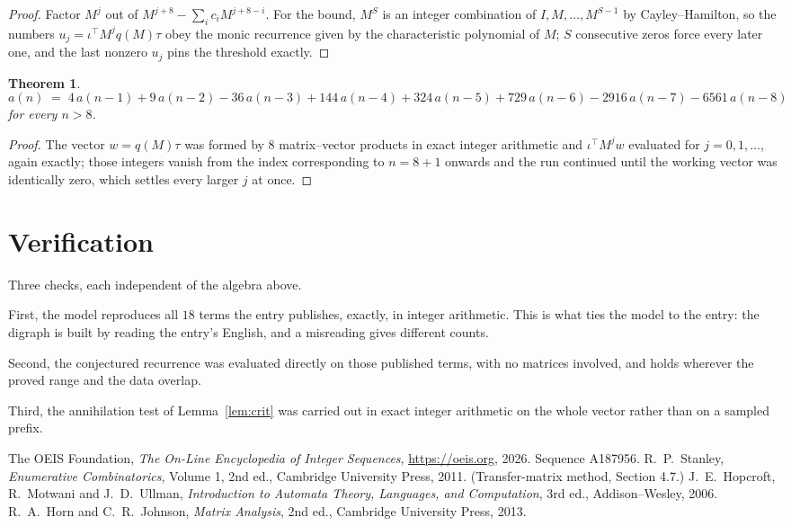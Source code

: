 \documentclass[11pt,a4paper]{article}
\theoremstyle{plain}
\newtheorem{theorem}{Theorem}
\theoremstyle{definition}
\begin{document}
\begin{proof}
Factor $M^{j}$ out of $M^{j+8}-\sum_ic_iM^{j+8-i}$. For the bound, $M^{S}$
is an integer combination of $I,M,\dots,M^{S-1}$ by Cayley--Hamilton, so the numbers
$u_j=\iota^{\!\top}M^{j}q(M)\tau$ obey the monic recurrence given by the characteristic
polynomial of $M$; $S$ consecutive zeros force every later one, and the last nonzero $u_j$
pins the threshold exactly.
\end{proof}

\begin{theorem}
\[
a(n)\;=\;4\,a(n-1) + 9\,a(n-2) - 36\,a(n-3) + 144\,a(n-4) + 324\,a(n-5) + 729\,a(n-6) - 2916\,a(n-7) - 6561\,a(n-8)
\]
for every $n>8$.
\end{theorem}

\begin{proof}
The vector $w=q(M)\tau$ was formed by $8$ matrix--vector products in exact integer
arithmetic and $\iota^{\!\top}M^{j}w$ evaluated for $j=0,1,\dots$, again exactly; those
integers vanish from the index corresponding to $n=8+1$ onwards and the run continued
until the working vector was identically zero, which settles every larger $j$ at once.
\end{proof}

\section{Verification}

Three checks, each independent of the algebra above.

First, the model reproduces all $18$ terms the entry publishes, exactly, in integer
arithmetic. This is what ties the model to the entry: the digraph is built by reading the
entry's English, and a misreading gives different counts.

Second, the conjectured recurrence was evaluated directly on those published terms, with no
matrices involved, and holds wherever the proved range and the data overlap.

Third, the annihilation test of Lemma~\ref{lem:crit} was carried out in exact integer
arithmetic on the whole vector rather than on a sampled prefix.

\begin{thebibliography}{9}
 The OEIS Foundation, \emph{The On-Line Encyclopedia of Integer
Sequences}, \url{https://oeis.org}, 2026. Sequence A187956.
 R.~P.~Stanley, \emph{Enumerative Combinatorics}, Volume 1, 2nd ed.,
Cambridge University Press, 2011. (Transfer-matrix method, Section 4.7.)
 J.~E.~Hopcroft, R.~Motwani and J.~D.~Ullman, \emph{Introduction to Automata
Theory, Languages, and Computation}, 3rd ed., Addison--Wesley, 2006.
 R.~A.~Horn and C.~R.~Johnson, \emph{Matrix Analysis}, 2nd ed., Cambridge
University Press, 2013.
\end{thebibliography}
\end{document}
